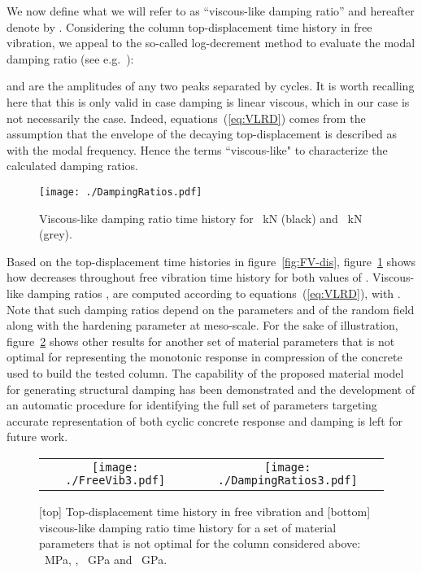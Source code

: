 \documentclass[12p]{amsart}
\begin{document}
We now define what we will refer to as ``viscous-like damping ratio'' and hereafter denote by . Considering the column top-displacement time history  in free vibration, we appeal to the so-called log-decrement method to evaluate the modal damping ratio  (see e.g.~\cite[\S 4.6]{CloPen1975}):

 and  are the amplitudes of any two peaks separated by  cycles. It is worth recalling here that this is only valid in case damping is linear viscous, which in our case is not necessarily the case. Indeed, equations~(\ref{eq:VLRD}) comes from the assumption that the envelope of the decaying top-displacement is described as  with  the modal frequency. Hence the terms ``viscous-like" to characterize the calculated damping ratios.

\begin{figure}[htb]
\begin{center}
\texttt{[image: ./DampingRatios.pdf]}
\caption{Viscous-like damping ratio time history  for ~kN (black) and ~kN (grey).}
\label{fig:xi-t}
\end{center}
\end{figure}

Based on the top-displacement time histories in figure~\ref{fig:FV-dis}, figure~\ref{fig:xi-t} shows how  decreases throughout free vibration time history for both values of . Viscous-like damping ratios , are computed according to equations~(\ref{eq:VLRD}), with . Note that such damping ratios depend on the parameters  and  of the random field along with the hardening parameter  at meso-scale. For the sake of illustration, figure~\ref{fig:FV-xi-3} shows other results for another set of material parameters that is not optimal for representing the monotonic response in compression of the concrete used to build the tested column. The capability of the proposed material model for generating structural damping has been demonstrated and the development of an automatic procedure for identifying the full set of parameters targeting accurate representation of both cyclic concrete response and damping is left for future work. 

\begin{figure}[htb]
\begin{center}
 \begin{tabular}{cc}
  \texttt{[image: ./FreeVib3.pdf]} & \texttt{[image: ./DampingRatios3.pdf]}
 \end{tabular}
\caption{[top] Top-displacement time history in free vibration and [bottom] viscous-like damping ratio time history  for a set of material parameters that is not optimal for the column considered above: ~MPa, , ~GPa and ~GPa.}
\label{fig:FV-xi-3}
\end{center}
\end{figure}
\end{document}
